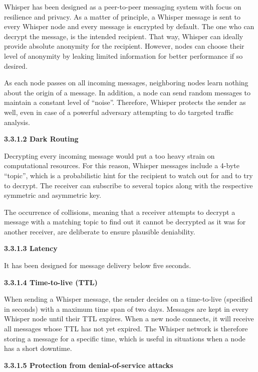 \documentclass{article}
\begin{document}
Whisper has been designed as a peer-to-peer messaging system with focus on resilience and privacy. As a matter of principle, a Whisper message is sent to every Whisper node and every message is encrypted by default. The one who can decrypt the message, is the intended recipient. That way, Whisper can ideally provide absolute anonymity for the recipient. However, nodes can choose their level of anonymity by leaking limited information for better performance if so desired.

As each node passes on all incoming messages, neighboring nodes learn nothing about the origin of a message. In addition, a node can send random messages to maintain a constant level of “noise”. Therefore, Whisper protects the sender as well, even in case of a powerful adversary attempting to do targeted traffic analysis.

\vspace{1em}
\noindent\normalsize\textbf{3.3.1.2	Dark Routing}

Decrypting every incoming message would put a too heavy strain on computational resources. For this reason, Whisper messages include a 4-byte “topic”, which is a probabilistic hint for the recipient to watch out for and to try to decrypt. The receiver can subscribe to several topics along with the respective symmetric and asymmetric key.

The occurrence of collisions, meaning that a receiver attempts to decrypt a message with a matching topic to find out it cannot be decrypted as it was for another receiver, are deliberate to ensure plausible deniability.


\vspace{1em}
\noindent\normalsize\textbf{3.3.1.3	Latency}

It has been designed for message delivery below five seconds.
\newpage

\vspace{1em}
\noindent\normalsize\textbf{3.3.1.4	Time-to-live (TTL)}

When sending a Whisper message, the sender decides on a time-to-live (specified in seconds) with a maximum time span of two days. Messages are kept in every Whisper node until their TTL expires. When a new node connects, it will receive all messages whose TTL has not yet expired. The Whisper network is therefore storing a message for a specific time, which is useful in situations when a node has a short downtime.

\vspace{1em}
\noindent\normalsize\textbf{3.3.1.5	Protection from denial-of-service attacks}
\end{document}
